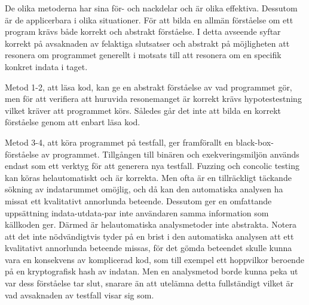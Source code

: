 
De olika metoderna har sina för- och nackdelar och är olika effektiva. Dessutom
är de applicerbara i olika situationer. För att bilda en allmän förståelse om
ett program krävs både korrekt och abstrakt förståelse. I
detta avseende syftar korrekt på avsaknaden av felaktiga slutsatser
och abstrakt på möjligheten att resonera om programmet generellt i
motsats till att resonera om en specifik konkret indata i taget.

Metod 1-2, att läsa kod, kan ge en abstrakt förståelse av vad
programmet gör, men för att verifiera att huruvida resonemanget är korrekt krävs
hypotestestning vilket kräver att programmet körs. Således går det inte att
bilda en korrekt förståelse genom att enbart läsa kod.

Metod 3-4, att köra programmet på testfall, ger framförallt en
black-box-förståelse av programmet. Tillgången till binären och
exekveringsmiljön används endast som ett verktyg för att generera nya testfall.
Fuzzing och concolic testing kan köras helautomatiskt och är korrekta.
Men ofta är en tillräckligt täckande sökning av indatarummet omöjlig, och då kan
den automatiska analysen ha missat ett kvalitativt annorlunda beteende. Dessutom
ger en omfattande uppsättning indata-utdata-par inte användaren samma
information som källkoden ger. Därmed är helautomatiska analysmetoder inte
abstrakta. Notera att det inte nödvändigtvis tyder på en brist i den
automatiska analysen att ett kvalitativt annorlunda beteende missas, för det
gömda beteendet skulle kunna vara en konsekvens av komplicerad kod, som till
exempel ett hoppvilkor beroende på en kryptografisk hash av indatan. Men en
analysmetod borde kunna peka ut var dess förståelse tar slut, snarare än att
utelämna detta fullständigt vilket är vad avsaknaden av testfall visar sig som.

